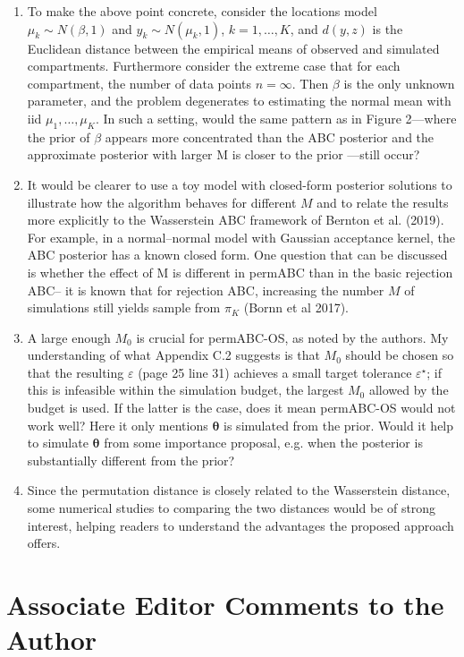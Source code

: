 \documentclass[10.5pt]{article}
\begin{document}
\begin{enumerate}
    \item To make the above point concrete, consider the locations model $\mu_k \sim N(\beta, 1)$ and $y_k \sim N(\mu_k, 1)$, $k = 1, \dots, K$, and $d(y, z)$ is the Euclidean distance between the empirical means of observed and simulated compartments. Furthermore consider the extreme case that for each compartment, the number of data points $n = \infty$. Then $\beta$ is the only unknown parameter, and the problem degenerates to estimating the normal mean with iid $\mu_1, \dots, \mu_K$. In such a setting, would the same pattern as in Figure 2—where the prior of $\beta$ appears more concentrated than the ABC posterior and the approximate posterior with larger M is closer to the prior —still occur?
    \item It would be clearer to use a toy model with closed-form posterior solutions to illustrate how the algorithm behaves for different $M$ and to relate the results more explicitly to the Wasserstein ABC framework of Bernton et al. (2019). For example, in a normal–normal model with Gaussian acceptance kernel, the ABC posterior has a known closed form. One question that can be discussed is whether the effect of M is different in permABC than in the basic rejection ABC– it is known that for rejection ABC, increasing the number $M$ of simulations still yields sample from $\pi_K$ (Bornn et al 2017).
    \item A large enough $M_0$ is crucial for permABC-OS, as noted by the authors. My understanding of what Appendix C.2 suggests is that $M_0$ should be chosen so that the resulting $\varepsilon$ (page 25 line 31) achieves a small target tolerance $\varepsilon^{\star}$; if this is infeasible within the simulation budget, the largest $M_0$ allowed by the budget is used. If the latter is the case, does it mean permABC-OS would not work well? Here it only mentions $\boldsymbol{\theta}$ is simulated from the prior. Would it help to simulate $\boldsymbol{\theta}$ from some importance proposal, e.g. when the posterior is substantially different from the prior?
    \item Since the permutation distance is closely related to the Wasserstein distance, some numerical studies to comparing the two distances would be of strong interest, helping readers to understand the advantages the proposed approach offers.
\end{enumerate}

\section*{Associate Editor Comments to the Author}
\end{document}
